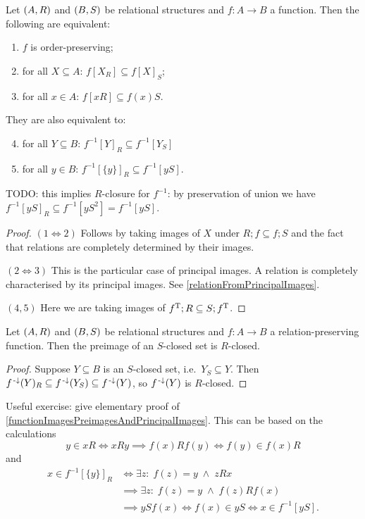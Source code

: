 \begin{corollary} \label{functionImagesPreimagesAndPrincipalImages}
Let $\sSet{A,R}$ and $\sSet{B, S}$ be relational structures and $f: A\to B$ a function. Then the following are equivalent:
\begin{enumerate}
\item $f$ is order-preserving;
\item for all $X\subseteq A$: $f[X_R] \subseteq f[X]_S$;
\item for all $x\in A$: $f[xR] \subseteq f(x)S$.
\end{enumerate}
They are also equivalent to:
\begin{enumerate} \setcounter{enumi}{3}
\item for all $Y\subseteq B$: $f^{-1}[Y]_R \subseteq f^{-1}[Y_S]$
\item for all $y\in B$: $f^{-1}[\{y\}]_R \subseteq f^{-1}[yS]$.
\end{enumerate}
\end{corollary}
TODO: this implies $R$-closure for $f^{-1}$: by preservation of union we have $f^{-1}[yS]_R \subseteq f^{-1}[yS^2] = f^{-1}[yS]$.
\begin{proof}
$(1 \Leftrightarrow 2)$ Follows by taking images of $X$ under $R;f \subseteq f;S$ and the fact that relations are completely determined by their images.

$(2 \Leftrightarrow 3)$ This is the particular case of principal images. A relation is completely characterised by its principal images. See \ref{relationFromPrincipalImages}.

$(4, 5)$ Here we are taking images of $f^{\mathrm{T}};R \subseteq S;f^{\mathrm{T}}$.
\end{proof}
\begin{corollary} \label{closurePreimageRelationPreservingFunctions}
Let $\sSet{A,R}$ and $\sSet{B, S}$ be relational structures and $f: A\to B$ a relation-preserving function. Then the preimage of an $S$-closed set is $R$-closed.
\end{corollary}
\begin{proof}
Suppose $Y\subseteq B$ is an $S$-closed set, i.e.\ $Y_S\subseteq Y$. Then $f^{\text{\hspace{0.15em}-}\downarrow}(Y)_R \subseteq f^{\text{\hspace{0.15em}-}\downarrow}(Y_S)\subseteq f^{\text{\hspace{0.15em}-}\downarrow}(Y)$, so $f^{\text{\hspace{0.15em}-}\downarrow}(Y)$ is $R$-closed.
\end{proof}

\begin{note}
Useful exercise: give elementary proof of \ref{functionImagesPreimagesAndPrincipalImages}. This can be based on the calculations
\[ y\in xR \iff xRy \implies f(x)Rf(y) \iff f(y) \in f(x)R \]
and
\begin{align*}
x\in f^{-1}[\{y\}]_R &\iff \exists z:\; f(z) = y \;\land\; zRx \\
&\implies \exists z:\; f(z) = y \;\land\; f(z)Rf(x) \\
&\implies ySf(x) \iff f(x) \in yS \iff x\in f^{-1}[yS].
\end{align*}
\end{note}

